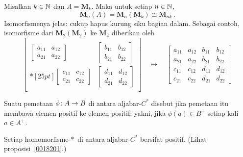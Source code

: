 \begin{exam} Misalkan $k \in \mathbb{N}$ dan $A = \mathbf M_k$. Maka untuk setiap $n \in \mathbb{N}$,
   \[ \mathbf M_n(A) = \mathbf M_n(\mathbf M_k) \cong \mathbf M_{nk}\,. \]
Isomorfismenya jelas: cukup hapus kurung siku bagian dalam. Sebagai contoh,
isomorfisme dari $\mathbf M_2(\mathbf M_2)$ ke $\mathbf M_4$ diberikan oleh
  \[ \begin{bmatrix} {} & {} \\
          \begin{bmatrix}
                          a_{11} & a_{12} \\
                          a_{21} & a_{22}
          \end{bmatrix}       &
          \begin{bmatrix} b_{11} & b_{12} \\
                          b_{21} & b_{22}
          \end{bmatrix}       \\*[25pt]
          \begin{bmatrix} c_{11} & c_{12} \\
                          c_{21} & c_{22}
          \end{bmatrix}       &
          \begin{bmatrix} d_{11} & d_{12} \\
                          d_{21} & d_{22}
          \end{bmatrix}       \\
                    {}  & {}
     \end{bmatrix}
    \quad \mapsto \quad
          \begin{bmatrix} a_{11} & a_{12} & b_{11} & b_{12} \\
                          a_{21} & a_{22} & b_{21} & b_{22} \\
                          c_{11} & c_{12} & d_{11} & d_{12} \\
                          c_{21} & c_{22} & d_{21} & d_{22}
          \end{bmatrix}
  \]
\end{exam}

\begin{defn} Suatu pemetaan $\phi\colon A \rightarrow B$ di antara aljabar-$C^*$ disebut  jika
pemetaan itu membawa elemen positif ke elemen positif; yakni, jika $\phi(a) \in B^+$ setiap kali
$a \in A^+$.
\end{defn}

\begin{exam} Setiap homomorfisme-$*\,$ di antara aljabar-$C^*$ bersifat positif. (Lihat
proposisi~\ref{0018201}.)
\end{exam}

